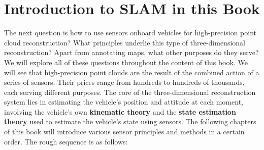 \section{Introduction to SLAM in this Book}

The next question is how to use sensors onboard vehicles for high-precision point cloud reconstruction? What principles underlie this type of three-dimensional reconstruction? Apart from annotating maps, what other purposes do they serve? We will explore all of these questions throughout the content of this book. We will see that high-precision point clouds are the result of the combined action of a series of sensors. Their prices range from hundreds to hundreds of thousands, each serving different purposes. The core of the three-dimensional reconstruction system lies in estimating the vehicle's position and attitude at each moment, involving the vehicle's own \textbf{kinematic theory} and the \textbf{state estimation theory} used to estimate the vehicle's state using sensors. The following chapters of this book will introduce various sensor principles and methods in a certain order. The rough sequence is as follows:

